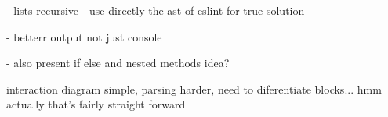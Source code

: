 - lists recursive
- use directly the ast of eslint for true solution

- betterr output not just console


- also present if else and nested methods idea? 

interaction diagram simple, parsing harder, need to diferentiate blocks... hmm actually that's fairly straight forward